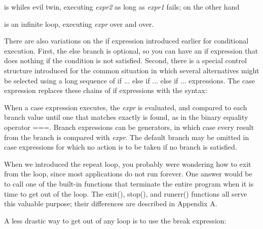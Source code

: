 \noindent is \textsf{while}{\textquotesingle}s evil twin, executing
\textsf{\textit{expr2}} as long as \textsf{\textit{expr1}}
fails; on the other hand


\noindent is an infinite loop, executing \textsf{\textit{expr}}
over and over.

There are also variations on the \textsf{if} expression introduced
earlier for conditional execution. First, the \textsf{else} branch is
optional, so you can have an \textsf{if} expression that does nothing
if the condition is not satisfied. Second, there is a special control
structure introduced for the common situation in which several
alternatives might be selected using a long sequence of \textsf{if ...
else if ... else if ...} expressions. The \textsf{case} expression replaces these chains of
\textsf{if} expressions with the syntax:


When a \textsf{case} expression executes, the \textsf{\textit{expr}} is
evaluated, and compared to each branch value until one that matches
exactly is found, as in the binary equality operator \textsf{===}.
Branch expressions can be generators, in which case every result from
the branch is compared with \textsf{\textit{expr}}. The default branch
may be omitted in case expressions for which no action is to be taken
if no branch is satisfied.

When we introduced the \textsf{repeat} loop, you probably were wondering
how to exit from the loop, since most applications do not run forever.
One answer would be to call one of the built-in functions that
terminate the entire program when it is time to get out of the loop.
The \textsf{exit()}, \textsf{stop()}, and \textsf{runerr()} functions
all serve this valuable purpose; their differences are described in
Appendix A.

A less drastic way to get out of any loop is to use the \textsf{break} expression:


